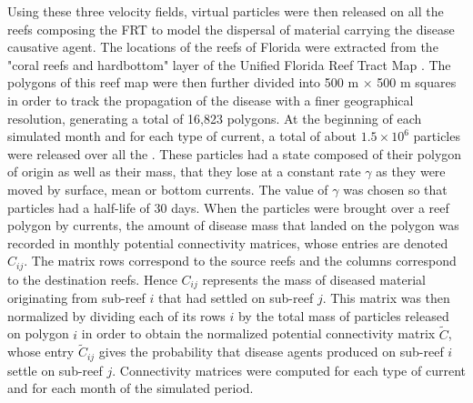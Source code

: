 Using these three velocity fields, virtual particles were then released on all the reefs composing the FRT to model the dispersal of material carrying the disease causative agent. The locations of the reefs of Florida were extracted from the "coral reefs and hardbottom" layer of the Unified Florida Reef Tract Map \citep{fwc2017unified}. The polygons of this reef map were then further divided into 500 m $\times$ 500 m squares in order to track the propagation of the disease with a finer geographical resolution, generating a total of 16,823 polygons. At the beginning of each simulated month and for each type of current, a total of about $1.5 \times 10^6$ particles were released over all the . These particles had a state composed of their polygon of origin as well as their mass, that they lose at a constant rate $\gamma$ as they were moved by surface, mean or bottom currents. The value of $\gamma$ was chosen so that particles had a half-life of 30 days. When the particles were brought over a reef polygon by currents, the amount of disease mass that landed on the polygon was recorded in monthly potential connectivity matrices, whose entries are denoted $C_{ij}$. The matrix rows correspond to the source reefs and the columns correspond to the destination reefs. Hence $C_{ij}$ represents the mass of diseased material originating from sub-reef $i$ that had settled on sub-reef $j$. This matrix was then normalized by dividing each of its rows $i$ by the total mass of particles released on polygon $i$ in order to obtain the normalized potential connectivity matrix $\tilde{C}$, whose entry $\tilde{C}_{ij}$ gives the probability that disease agents produced on sub-reef $i$ settle on sub-reef $j$. Connectivity matrices were computed for each type of current and for each month of the simulated period.

